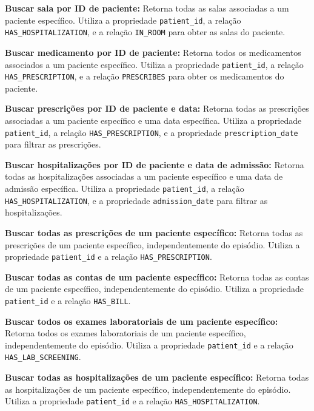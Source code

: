 \vspace{0.15cm}
\textbf{Buscar sala por ID de paciente:} Retorna todas as salas associadas a um paciente específico. Utiliza a propriedade \texttt{patient\_id}, a relação \texttt{HAS\_HOSPITALIZATION}, e a relação \texttt{IN\_ROOM} para obter as salas do paciente.

\vspace{0.15cm}
\textbf{Buscar medicamento por ID de paciente:} Retorna todos os medicamentos associados a um paciente específico. Utiliza a propriedade \texttt{patient\_id}, a relação \texttt{HAS\_PRESCRIPTION}, e a relação \texttt{PRESCRIBES} para obter os medicamentos do paciente.

\vspace{0.15cm}
\textbf{Buscar prescrições por ID de paciente e data:} Retorna todas as prescrições associadas a um paciente específico e uma data específica. Utiliza a propriedade \texttt{patient\_id}, a relação \texttt{HAS\_PRESCRIPTION}, e a propriedade \texttt{prescription\_date} para filtrar as prescrições.

\vspace{0.15cm}
\textbf{Buscar hospitalizações por ID de paciente e data de admissão:} Retorna todas as hospitalizações associadas a um paciente específico e uma data de admissão específica. Utiliza a propriedade \texttt{patient\_id}, a relação \texttt{HAS\_HOSPITALIZATION}, e a propriedade \texttt{admission\_date} para filtrar as hospitalizações.

\vspace{0.15cm}
\textbf{Buscar todas as prescrições de um paciente específico:} Retorna todas as prescrições de um paciente específico, independentemente do episódio. Utiliza a propriedade \texttt{patient\_id} e a relação \texttt{HAS\_PRESCRIPTION}.

\vspace{0.15cm}
\textbf{Buscar todas as contas de um paciente específico:} Retorna todas as contas de um paciente específico, independentemente do episódio. Utiliza a propriedade \texttt{patient\_id} e a relação \texttt{HAS\_BILL}.

\vspace{0.15cm}
\textbf{Buscar todos os exames laboratoriais de um paciente específico:} Retorna todos os exames laboratoriais de um paciente específico, independentemente do episódio. Utiliza a propriedade \texttt{patient\_id} e a relação \texttt{HAS\_LAB\_SCREENING}.

\vspace{0.15cm}
\textbf{Buscar todas as hospitalizações de um paciente específico:} Retorna todas as hospitalizações de um paciente específico, independentemente do episódio. Utiliza a propriedade \texttt{patient\_id} e a relação \texttt{HAS\_HOSPITALIZATION}.

